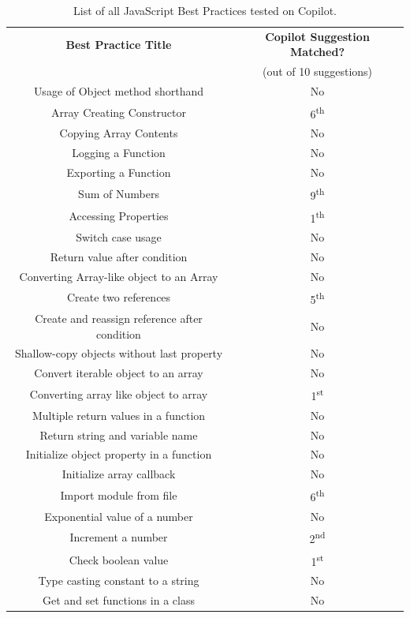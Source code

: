 \begin{table}[hbt]

    \begin{tabular}{|c|c|}
        \hline
    \centering
         \textbf{Best Practice  Title} & \textbf{Copilot Suggestion Matched?} \\
         & (out of 10 suggestions) \\
         \hline
         Usage of Object method shorthand & No \\
         \hline
         Array Creating Constructor & 6\textsuperscript{th} \\
         \hline
         Copying Array Contents  & No \\
         \hline
         Logging a Function &  No \\
         \hline
         Exporting a Function & No \\
         \hline
         Sum of Numbers & 9\textsuperscript{th} \\
         \hline
         Accessing Properties & 1\textsuperscript{th} \\
         \hline
         Switch case usage & No \\
         \hline
         Return value after condition & No \\
         \hline
         Converting Array-like object to an Array  & No \\
         \hline
         Create two references & 5\textsuperscript{th} \\
         \hline
         Create and reassign reference after condition & No \\
         \hline
         Shallow-copy objects without last property & No \\
         \hline
         Convert iterable object to an array & No \\
         \hline
         Converting array like object to array & 1\textsuperscript{st} \\
         \hline
          Multiple return values in a function & No \\
          \hline
          Return string and variable name & No \\
          \hline
          Initialize object property in a function & No \\
          \hline
          Initialize array callback & No \\
          \hline
          Import module from file & 6\textsuperscript{th} \\
          \hline
          Exponential value of a number & No \\
          \hline
          Increment a number & 2\textsuperscript{nd} \\
          \hline
          Check boolean value & 1\textsuperscript{st} \\
          \hline
          Type casting constant to a string & No \\
          \hline
          Get and set functions in a class & No \\
          \hline
    \end{tabular}
    \caption{List of all JavaScript Best Practices tested on Copilot.}
    \label{tab:all_bp}
\end{table}

